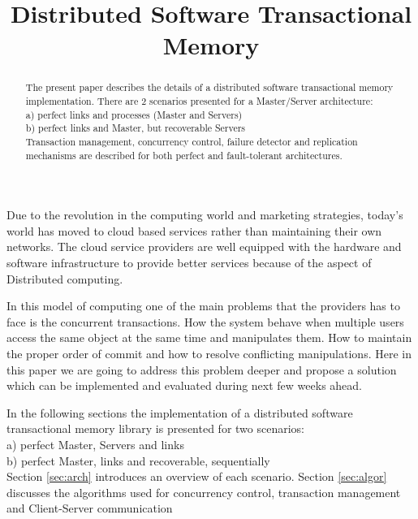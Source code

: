 \documentclass[times, 10pt,twocolumn]{article}
\begin{document}
\title{Distributed Software Transactional Memory}

\maketitle
\thispagestyle{empty}

\begin{abstract}


   The present paper describes the details of a distributed software
   transactional memory implementation.
   There are 2 scenarios presented for a Master/Server architecture: \\
   a) perfect links and processes (Master and Servers) \\
   b) perfect links and Master, but recoverable Servers \\

   Transaction management, concurrency control, failure detector and 
   replication mechanisms are described for both perfect and fault-tolerant
   architectures.
   
\end{abstract}



Due to the revolution in the computing world and marketing strategies, today’s world has moved to cloud based services rather than maintaining their own networks. The cloud service providers are well
equipped with the hardware and software infrastructure to provide better services because of the aspect of Distributed computing. 

In this model of computing one of the main problems that the providers has to face is the concurrent transactions. How the system behave when multiple users access the same object at the same 
time and manipulates them. How to maintain the proper order of commit and how to resolve conflicting manipulations. Here in this paper we are going to address this problem deeper and propose 
a solution which can be implemented and evaluated during next few weeks ahead.

In the following sections the implementation of a distributed software transactional memory library is presented for two scenarios: \\
a) perfect Master, Servers and links \\
b) perfect Master, links and recoverable, sequentially \\

Section \ref{sec:arch} introduces an overview of each scenario. Section 
\ref{sec:algor} discusses the algorithms used for concurrency control, 
transaction management and Client-Server communication
\end{document}
